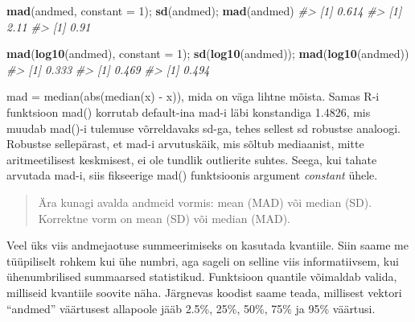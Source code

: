 \documentclass[]{book}
\newenvironment{Shaded}{\begin{snugshade}}{\end{snugshade}}
\newcommand{\KeywordTok}[1]{\textcolor[rgb]{0.13,0.29,0.53}{\textbf{#1}}}
\newcommand{\DataTypeTok}[1]{\textcolor[rgb]{0.13,0.29,0.53}{#1}}
\newcommand{\DecValTok}[1]{\textcolor[rgb]{0.00,0.00,0.81}{#1}}
\newcommand{\FloatTok}[1]{\textcolor[rgb]{0.00,0.00,0.81}{#1}}
\newcommand{\CommentTok}[1]{\textcolor[rgb]{0.56,0.35,0.01}{\textit{#1}}}
\newcommand{\NormalTok}[1]{#1}
\begin{document}
\begin{Shaded}
\begin{Highlighting}[]
\KeywordTok{mad}\NormalTok{(andmed, }\DataTypeTok{constant =} \DecValTok{1}\NormalTok{); }\KeywordTok{sd}\NormalTok{(andmed); }\KeywordTok{mad}\NormalTok{(andmed)}
\CommentTok{#> [1] 0.614}
\CommentTok{#> [1] 2.11}
\CommentTok{#> [1] 0.91}
\end{Highlighting}
\end{Shaded}

\begin{Shaded}
\begin{Highlighting}[]
\KeywordTok{mad}\NormalTok{(}\KeywordTok{log10}\NormalTok{(andmed), }\DataTypeTok{constant =} \DecValTok{1}\NormalTok{); }\KeywordTok{sd}\NormalTok{(}\KeywordTok{log10}\NormalTok{(andmed)); }\KeywordTok{mad}\NormalTok{(}\KeywordTok{log10}\NormalTok{(andmed))}
\CommentTok{#> [1] 0.333}
\CommentTok{#> [1] 0.469}
\CommentTok{#> [1] 0.494}
\end{Highlighting}
\end{Shaded}

mad = median(abs(median(x) - x)), mida on väga lihtne mõista. Samas R-i
funktsioon mad() korrutab default-ina mad-i läbi konstandiga 1.4826, mis
muudab mad()-i tulemuse võrreldavaks sd-ga, tehes sellest sd robustse
analoogi. Robustse sellepärast, et mad-i arvutuskäik, mis sõltub
mediaanist, mitte aritmeetilisest keskmisest, ei ole tundlik outlierite
suhtes. Seega, kui tahate arvutada mad-i, siis fikseerige mad()
funktsioonis argument \emph{constant} ühele.

\begin{quote}
Ära kunagi avalda andmeid vormis: mean (MAD) või median (SD). Korrektne
vorm on mean (SD) või median (MAD).
\end{quote}

Veel üks viis andmejaotuse summeerimiseks on kasutada kvantiile. Siin
saame me tüüpiliselt rohkem kui ühe numbri, aga sageli on selline viis
informatiivsem, kui ühenumbrilised summaarsed statistikud. Funktsioon
quantile võimaldab valida, milliseid kvantiile soovite näha. Järgnevas
koodist saame teada, millisest vektori ``andmed'' väärtusest allapoole
jääb 2.5\%, 25\%, 50\%, 75\% ja 95\% väärtusi.

\begin{Shaded}
\end{Shaded}
\end{document}
